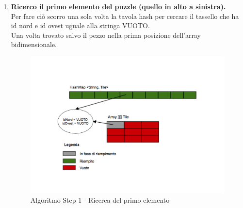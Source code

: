 	\begin{enumerate}
		\item \textbf{Ricerco il primo elemento del puzzle (quello in alto a sinistra).} \\
		Per fare ciò scorro una sola volta la tavola hash per cercare il tassello che ha id nord e id ovest uguale alla stringa VUOTO. \\
		Una volta trovato salvo il pezzo nella prima posizione dell'array bidimensionale.
		\begin{figure}[htbp]
			\centering
			\includegraphics[width=15cm]{img/algpuzzle_step1.pdf}
			\caption{Algoritmo Step 1 - Ricerca del primo elemento}
			\label{Algoritmo Step 1 - Ricerca del primo elemento}
		\end{figure}
		

\end{enumerate}
